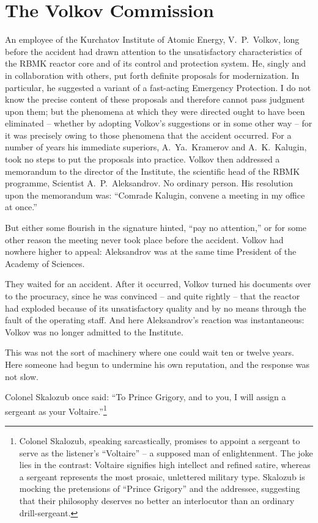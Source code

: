 \documentclass[openright]{bookest}
\begin{document}
\section{The Volkov Commission}

An employee of the Kurchatov Institute of Atomic Energy, V.~P.~Volkov, long before the accident had drawn attention to the unsatisfactory characteristics of the RBMK reactor core and of its control and protection system. He, singly and in collaboration with others, put forth definite proposals for modernization. In particular, he suggested a variant of a fast-acting Emergency Protection. I do not know the precise content of these proposals and therefore cannot pass judgment upon them; but the phenomena at which they were directed ought to have been eliminated -- whether by adopting Volkov's suggestions or in some other way -- for it was precisely owing to those phenomena that the accident occurred. For a number of years his immediate superiors, A.~Ya.~Kramerov and A.~K.~Kalugin, took no steps to put the proposals into practice. Volkov then addressed a memorandum to the director of the Institute, the scientific head of the RBMK programme, Scientist A.~P.~Aleksandrov. No ordinary person. His resolution upon the memorandum was: ``Comrade Kalugin, convene a meeting in my office at once.''

But either some flourish in the signature hinted, ``pay no attention,'' or for some other reason the meeting never took place before the accident. Volkov had nowhere higher to appeal: Aleksandrov was at the same time President of the Academy of Sciences.

They waited for an accident. After it occurred, Volkov turned his documents over to the procuracy, since he was convinced -- and quite rightly -- that the reactor had exploded because of its unsatisfactory quality and by no means through the fault of the operating staff. And here Aleksandrov's reaction was instantaneous: Volkov was no longer admitted to the Institute.

This was not the sort of machinery where one could wait ten or twelve years. Here someone had begun to undermine his own reputation, and the response was not slow.

Colonel Skalozub once said: ``To Prince Grigory, and to you, I will assign a sergeant as your Voltaire.''\footnote{Colonel Skalozub, speaking sarcastically, promises to appoint a sergeant to serve as the listener's ``Voltaire'' -- a supposed man of enlightenment. The joke lies in the contrast: Voltaire signifies high intellect and refined satire, whereas a sergeant represents the most prosaic, unlettered military type. Skalozub is mocking the pretensions of ``Prince Grigory'' and the addressee, suggesting that their philosophy deserves no better an interlocutor than an ordinary drill-sergeant.}
\end{document}
